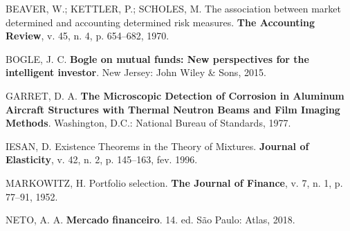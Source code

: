 \documentclass[grad,numbers]{coppe}
\begin{document}
  \hypertarget{refs}{}
  \leavevmode\hypertarget{ref-beaver1970}{}%
  BEAVER, W.; KETTLER, P.; SCHOLES, M. The association between market determined and accounting determined risk measures. \textbf{The Accounting Review}, v. 45, n. 4, p. 654--682, 1970.
  
  \leavevmode\hypertarget{ref-bogle2015}{}%
  BOGLE, J. C. \textbf{Bogle on mutual funds: New perspectives for the intelligent investor}. New Jersey: John Wiley \& Sons, 2015.
  
  \leavevmode\hypertarget{ref-techreport-exampleIn}{}%
  GARRET, D. A. \textbf{The Microscopic Detection of Corrosion in Aluminum Aircraft Structures with Thermal Neutron Beams and Film Imaging Methods}. Washington, D.C.: National Bureau of Standards, 1977.
  
  \leavevmode\hypertarget{ref-article-example}{}%
  IESAN, D. Existence Theorems in the Theory of Mixtures. \textbf{Journal of Elasticity}, v. 42, n. 2, p. 145--163, fev. 1996.
  
  \leavevmode\hypertarget{ref-markowitz1952}{}%
  MARKOWITZ, H. Portfolio selection. \textbf{The Journal of Finance}, v. 7, n. 1, p. 77--91, 1952.
  
  \leavevmode\hypertarget{ref-assafneto2018}{}%
  NETO, A. A. \textbf{Mercado financeiro}. 14. ed. São Paulo: Atlas, 2018.

  \backmatter
  
  

\end{document}
